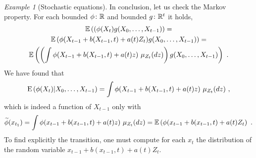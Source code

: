 \documentclass[12pt,a4paper]{amsart}
\theoremstyle{plain}%
\theoremstyle{definition}
\theoremstyle{remark}
\newtheorem{example}{Example}
\begin{document}
\begin{example}[Stochastic equations]
In conclusion, let us check the Markov property. For each
bounded $\phi \colon \mathbb{R}$ and bounded $g \colon \mathbb{R}^t$ it holds,
\begin{multline*}
  \operatorname{\mathbb E}\left((\phi(X_t)g(X_0,\dots,X_{t-1})\right) = \\
  \operatorname{\mathbb E}\left(\phi(X_{t-1} + b(X_{t-1},t) +
    a(t)Z_t)g(X_0,\dots,X_{t-1})\right) = \\
  \operatorname{\mathbb E}\left(\left(\int \phi(X_{t-1} + b(X_{t-1},t) +
    a(t)z) \ \mu_{Z_t}(dz)\right) g(X_0,\dots,X_{t-1})\right)  \ .
\end{multline*}
We have found that
\begin{equation*}
  \operatorname{E}\left(\phi(X_t) \middle| X_0,\dots,X_{t-1}\right) = \int \phi(X_{t-1} + b(X_{t-1},t) +
    a(t)z) \ \mu_{Z_t}(dz) \ ,
\end{equation*}
which is indeed a function of $X_{t-1}$ only with
\begin{equation*}
  \widetilde \phi(x_{t_1}) = \int \phi(x_{t-1} + b(x_{t-1},t) +
    a(t)z) \ \mu_{Z_t}(dz) = \operatorname{\mathbb E}\left(\phi(x_{t-1} + b(x_{t-1},t) +
    a(t)Z_t\right) \ .
\end{equation*}
To find explicitly the transition, one must compute for each $x_t$ the
distribution of  the random variable $x_{t-1} + b(x_{t-1},t) +
    a(t)Z_t$.
\end{example}
\end{document}
